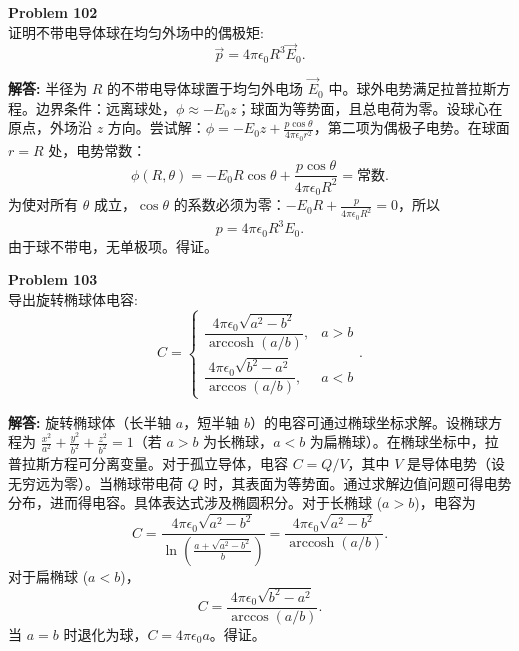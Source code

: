 \documentclass[12pt, a4paper, oneside]{ctexart}
\newenvironment{solution}{\par\noindent\textbf{解答:}\quad}{\par}
\begin{document}
\begin{mdframed}[backgroundcolor=gray!10, linewidth=0pt]
    \textbf{Problem 102} \\
    证明不带电导体球在均匀外场中的偶极矩:
    \[
    \vec{p} = 4\pi\epsilon_0 R^3 \vec{E}_0.
    \]
\end{mdframed}
\begin{solution}
    半径为 $R$ 的不带电导体球置于均匀外电场 $\vec{E}_0$ 中。球外电势满足拉普拉斯方程。边界条件：远离球处，$\phi \approx -E_0 z$；球面为等势面，且总电荷为零。设球心在原点，外场沿 $z$ 方向。尝试解：$\phi = -E_0 z + \frac{p \cos\theta}{4\pi\epsilon_0 r^2}$，第二项为偶极子电势。在球面 $r=R$ 处，电势常数：
    \[
    \phi(R, \theta) = -E_0 R \cos\theta + \frac{p \cos\theta}{4\pi\epsilon_0 R^2} = \text{常数}.
    \]
    为使对所有 $\theta$ 成立，$\cos\theta$ 的系数必须为零：$-E_0 R + \frac{p}{4\pi\epsilon_0 R^2} = 0$，所以
    \[
    p = 4\pi\epsilon_0 R^3 E_0.
    \]
    由于球不带电，无单极项。得证。
\end{solution}

\begin{mdframed}[backgroundcolor=gray!10, linewidth=0pt]
    \textbf{Problem 103} \\
    导出旋转椭球体电容:
    \[
    C = \begin{cases}
        \dfrac{4\pi\epsilon_0 \sqrt{a^2 - b^2}}{\operatorname{arccosh}(a/b)}, & a > b \\
        \dfrac{4\pi\epsilon_0 \sqrt{b^2 - a^2}}{\arccos(a/b)}, & a < b
    \end{cases}.
    \]
\end{mdframed}
\begin{solution}
    旋转椭球体（长半轴 $a$，短半轴 $b$）的电容可通过椭球坐标求解。设椭球方程为 $\frac{x^2}{a^2} + \frac{y^2}{b^2} + \frac{z^2}{b^2} = 1$（若 $a>b$ 为长椭球，$a<b$ 为扁椭球）。在椭球坐标中，拉普拉斯方程可分离变量。对于孤立导体，电容 $C = Q/V$，其中 $V$ 是导体电势（设无穷远为零）。当椭球带电荷 $Q$ 时，其表面为等势面。通过求解边值问题可得电势分布，进而得电容。具体表达式涉及椭圆积分。对于长椭球 ($a>b$)，电容为
    \[
    C = \frac{4\pi\epsilon_0 \sqrt{a^2 - b^2}}{\ln\left( \frac{a+\sqrt{a^2-b^2}}{b} \right)} = \frac{4\pi\epsilon_0 \sqrt{a^2 - b^2}}{\operatorname{arccosh}(a/b)}.
    \]
    对于扁椭球 ($a<b$)，
    \[
    C = \frac{4\pi\epsilon_0 \sqrt{b^2 - a^2}}{\arccos(a/b)}.
    \]
    当 $a=b$ 时退化为球，$C=4\pi\epsilon_0 a$。得证。
\end{solution}
\end{document}
